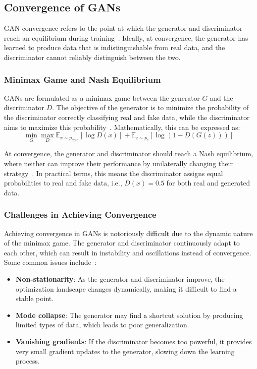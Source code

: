 \subsection{Convergence of GANs}
GAN convergence refers to the point at which the generator and discriminator reach an equilibrium during training~\cite{goodfellow2014generative}. Ideally, at convergence, the generator has learned to produce data that is indistinguishable from real data, and the discriminator cannot reliably distinguish between the two.

\subsubsection{Minimax Game and Nash Equilibrium}
GANs are formulated as a minimax game between the generator \(G\) and the discriminator \(D\). The objective of the generator is to minimize the probability of the discriminator correctly classifying real and fake data, while the discriminator aims to maximize this probability~\cite{farnia2020gans}. Mathematically, this can be expressed as:
\[
\min_G \max_D \mathbb{E}_{x \sim p_{data}}[\log D(x)] + \mathbb{E}_{z \sim p_z}[\log (1 - D(G(z)))]
\]

At convergence, the generator and discriminator should reach a Nash equilibrium, where neither can improve their performance by unilaterally changing their strategy~\cite{fudenberg1991game, farnia2020gans}. In practical terms, this means the discriminator assigns equal probabilities to real and fake data, i.e., \(D(x) = 0.5\) for both real and generated data.

\subsubsection{Challenges in Achieving Convergence}
Achieving convergence in GANs is notoriously difficult due to the dynamic nature of the minimax game. The generator and discriminator continuously adapt to each other, which can result in instability and oscillations instead of convergence. Some common issues include~\cite{heusel2017gans, farnia2020gans}:
\begin{itemize}
    \item \textbf{Non-stationarity}: As the generator and discriminator improve, the optimization landscape changes dynamically, making it difficult to find a stable point.
    \item \textbf{Mode collapse}: The generator may find a shortcut solution by producing limited types of data, which leads to poor generalization.
    \item \textbf{Vanishing gradients}: If the discriminator becomes too powerful, it provides very small gradient updates to the generator, slowing down the learning process.
\end{itemize}

